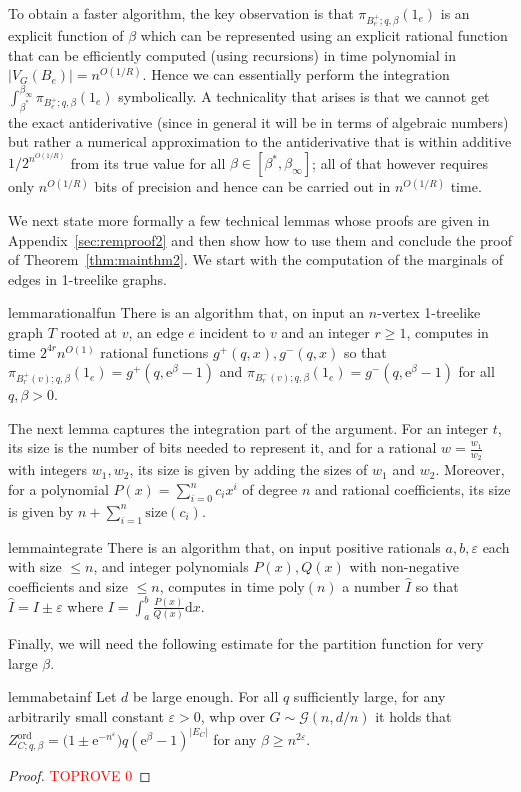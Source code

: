 \documentclass[11pt]{article}
\theoremstyle{plain}
\let\epsilon=\varepsilon
\newcommand{\emm}{\mathrm{e}}
\newcommand{\1}{\mathbb{1}}
\newcommand{\ord}{\mathrm{ord}}
\begin{document}
To obtain a faster algorithm, the key observation is that $\pi_{B_e^+;q,\beta}(1_e)$ is an explicit function of $\beta$ which can be represented using an explicit rational function that can be efficiently computed (using recursions) in time polynomial in $|V_G(B_e)|=n^{O(1/R)}$. Hence we can essentially perform the integration $\int^{\beta_\infty}_{\beta^*}\pi_{B_e^+;q,\beta}(1_e)$ symbolically. A technicality that arises is that we cannot get the exact antiderivative (since in general it will be in terms of algebraic numbers) but rather a numerical approximation to the antiderivative that is within additive $1/2^{n^{O(1/R)}}$ from its true value for all $\beta\in [\beta^*,\beta_\infty]$; all of that however requires only $n^{O(1/R)}$ bits of precision and hence can be carried out in $n^{O(1/R)}$ time.  

We next state more formally a few technical lemmas whose proofs are given in Appendix~\ref{sec:remproof2} and then show how to use them and conclude the proof of Theorem~\ref{thm:mainthm2}. We start with the computation of the marginals of edges in 1-treelike graphs.
\begin{restatable}{lemma}{rationalfun}\label{lem:rationalfun}
There is an algorithm that, on input an $n$-vertex  1-treelike graph $T$  rooted at $v$, an edge $e$ incident to $v$ and an integer $r\geq 1$, computes in time $2^{4r}n^{O(1)}$ rational functions $g^+(q,x), g^-(q,x)$ so that $\pi_{B^+_r(v);q,\beta}(1_e)=g^+(q,\emm^\beta-1)$ and $\pi_{B^-_r(v);q,\beta}(1_e)=g^-(q,\emm^{\beta}-1)$ for all $q,\beta>0$.
\end{restatable}
The next lemma captures the integration part of the argument. For an integer $t$, its size is the number of bits needed to represent it, and for a rational $w=\frac{w_1}{w_2}$ with integers $w_1,w_2$, its size is given by adding the sizes of $w_1$ and $w_2$. Moreover, for a polynomial $P(x)=\sum^n_{i=0}c_i x^{i}$ of degree $n$ and rational  coefficients, its size is given by   $n+\sum^n_{i=1}\mathrm{size}(c_i)$.
\begin{restatable}{lemma}{integrate}\label{lem:integrate}
There is an algorithm that, on input positive rationals $a,b, \epsilon$ each with size $\leq n$, and integer polynomials $P(x), Q(x)$ with non-negative coefficients and size $\leq n$, computes in time $\text{poly}(n)$ a number $\hat I$ so that $\hat I=I\pm \epsilon$ where $I=\displaystyle\int^b_{a}\frac{P(x)}{Q(x)}\mathrm{d} x$.
\end{restatable}
Finally, we will need the following estimate for the partition function for very large $\beta$.
\begin{restatable}{lemma}{betainf}\label{lem:betainf}
Let $d$ be large enough. For all $q$ sufficiently large,  for any arbitrarily small constant $\epsilon>0$, whp over $G\sim \mathcal{G}(n,d/n)$ it holds that $Z^{\ord}_{C;q,\beta}=\big(1\pm \emm^{-n^{\epsilon}}) q (\emm^{\beta}-1)^{|E_C|}$  for any $\beta\geq n^{2\epsilon}$.
\end{restatable}
\begin{proof}\textcolor{red}{TOPROVE 0}\end{proof}
\end{document}
